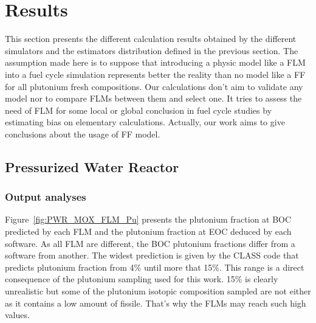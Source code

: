 
\section{Results}

This section presents the different calculation results obtained by the
different simulators and the estimators distribution defined in the previous
section.  The assumption made here is to suppose that introducing a physic model
like a \gls{FLM} into a fuel cycle simulation represents better the reality than
no model like a \gls{FF} for all plutonium fresh compositions. Our calculations
don't aim to validate any model nor to compare \gls{FLM}s between them and
select one. It tries to assess the need of \gls{FLM} for some local or global
conclusion in fuel cycle studies by estimating bias on elementary calculations.
Actually, our work aims to give conclusions about the usage of \gls{FF} model.   

\subsection{Pressurized Water Reactor}
\subsubsection{Output analyses}

Figure~\ref{fig:PWR_MOX_FLM_Pu} presents the plutonium fraction at \gls{BOC} predicted
by each \gls{FLM} and the plutonium fraction at \gls{EOC} deduced by each software. As all
FLM are different, the \gls{BOC} plutonium fractions differ from a software from
another. The widest prediction is given by the CLASS code that predicts plutonium
fraction from 4\% until more that 15\%. This range is a direct consequence of
the plutonium sampling used for this work. 15\% is clearly unrealistic but some
of the plutonium isotopic composition sampled are not either as it contains a low
amount of fissile. That's why the \gls{FLM}s may reach such high values.    

